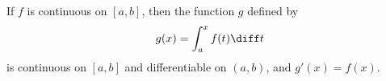 \begin{frame}
\begin{theorem}
If $f$ is continuous on $[a,b]$, then the function $g$ defined by
\[
g(x) = \int_a^x f(t)\diff t
\]
is continuous on $[a,b]$ and differentiable on $(a, b)$, and $g'(x) = f(x)$.
\end{theorem}
\end{frame}
